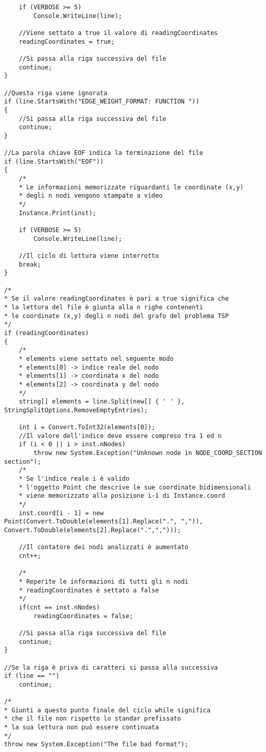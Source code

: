 \documentclass[11pt]{article}
\begin{document}
\begin{lstlisting}
    if (VERBOSE >= 5)
        Console.WriteLine(line);
        
    //Viene settato a true il valore di readingCoordinates
    readingCoordinates = true;
    
    //Si passa alla riga successiva del file
    continue;
}

//Questa riga viene ignorata
if (line.StartsWith("EDGE_WEIGHT_FORMAT: FUNCTION "))
{
    //Si passa alla riga successiva del file
    continue;
}

//La parola chiave EOF indica la terminazione del file
if (line.StartsWith("EOF"))
{
    /*
    * Le informazioni memorizzate riguardanti le coordinate (x,y)
    * degli n nodi vengono stampate a video
    */
    Instance.Print(inst);
    
    if (VERBOSE >= 5)
        Console.WriteLine(line);
    
    //Il ciclo di lettura viene interrotto
    break;
}

/*
* Se il valore readingCoordinates è pari a true significa che
* la lettura del file è giunta alla n righe contenenti
* le coordinate (x,y) degli n nodi del grafo del problema TSP
*/
if (readingCoordinates)
{
    /*
    * elements viene settato nel seguente modo
    * elements[0] -> indice reale del nodo
    * elements[1] -> coordinata x del nodo
    * elements[2] -> coordinata y del nodo
    */
    string[] elements = line.Split(new[] { ' ' }, StringSplitOptions.RemoveEmptyEntries);

    int i = Convert.ToInt32(elements[0]);
    //Il valore dell'indice deve essere compreso tra 1 ed n
    if (i < 0 || i > inst.nNodes)
        throw new System.Exception("Unknown node in NODE_COORD_SECTION section");
    /*
    * Se l'indice reale i è valido
    * l'oggetto Point che descrive le sue coordinate bidimensionali
    * viene memorizzato alla posizione i-1 di Instance.coord
    */
    inst.coord[i - 1] = new Point(Convert.ToDouble(elements[1].Replace(".", ",")), Convert.ToDouble(elements[2].Replace(".",",")));
    
    //Il contatore dei nodi analizzati è aumentato
    cnt++;
    
    /*
    * Reperite le informazioni di tutti gli n nodi
    * readingCoordinates è settato a false
    */
    if(cnt == inst.nNodes)
        readingCoordinates = false;
    
    //Si passa alla riga successiva del file
    continue;
}

//Se la riga è priva di caratteri si passa alla successiva
if (line == "")
    continue;

/*
* Giunti a questo punto finale del ciclo while significa 
* che il file non rispetto lo standar prefissato
* la sua lettura non può essere continuata
*/
throw new System.Exception("The file bad format");

\end{lstlisting}
\end{document}
